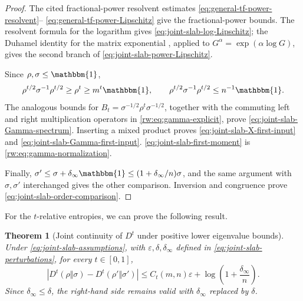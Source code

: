 \documentclass[11pt]{article}
\newtheorem{theorem}[theorem]{Theorem}
\theoremstyle{remark}
\newcommand{\1}{\mathbbm{1}}
\begin{document}
\begin{proof}
The cited fractional-power resolvent estimates
\eqref{eq:general-tf-power-resolvent}--%
\eqref{eq:general-tf-power-Lipschitz} give the fractional-power
bounds.  The resolvent formula for the logarithm
\cite[Example~2.11, Eq.~(2.6)]{vershynina2019upper} gives
\eqref{eq:joint-slab-log-Lipschitz}; the Duhamel identity for the
matrix exponential
\cite[the identity preceding Eq.~(6.42), p.~225]
{bhatia2009positive}, applied to
$G^\alpha=\exp(\alpha\log G)$, gives the second branch of
\eqref{eq:joint-slab-power-Lipschitz}.

Since $\rho,\sigma\leq\1$,
\begin{equation}
 \rho^{t/2}\sigma^{-1}\rho^{t/2}
 \geq\rho^t\geq m^t\1,
 \qquad
 \rho^{t/2}\sigma^{-1}\rho^{t/2}\leq n^{-1}\1.
\end{equation}
The analogous bounds for
$B_t=\sigma^{-1/2}\rho^t\sigma^{-1/2}$, together with the commuting
left and right multiplication operators in
\eqref{rw:eq:gamma-explicit}, prove
\eqref{eq:joint-slab-Gamma-spectrum}.  Inserting a mixed product
proves \eqref{eq:joint-slab-X-first-input} and
\eqref{eq:joint-slab-Gamma-first-input}.
\eqref{eq:joint-slab-first-moment} is
\eqref{rw:eq:gamma-normalization}.

Finally,
$\sigma'\leq\sigma+\delta_\infty\1
\leq(1+\delta_\infty/n)\sigma$, and the same
argument with $\sigma,\sigma'$ interchanged gives the other
comparison.  Inversion and congruence prove
\eqref{eq:joint-slab-order-comparison}.
\end{proof}

For the $t$-relative entropies, we can prove the following result.

\begin{theorem}[Joint continuity of $D^t$ under positive lower
eigenvalue bounds]
\label{theo:joint-slab-Dt-continuity}
Under \eqref{eq:joint-slab-assumptions}, with
$\varepsilon,\delta,\delta_\infty$ defined in
\eqref{eq:joint-slab-perturbations}, for every $t\in[0,1]$,
\begin{equation}
 \left|D^t(\rho\Vert\sigma)-D^t(\rho'\Vert\sigma')\right|
 \leq C_t(m,n)\varepsilon
 +\log\left(1+\frac{\delta_\infty}{n}\right).
 \label{eq:joint-slab-Dt-bound}
\end{equation}
Since $\delta_\infty\leq\delta$, the right-hand side remains valid
with $\delta_\infty$ replaced by $\delta$.
\end{theorem}
\end{document}
